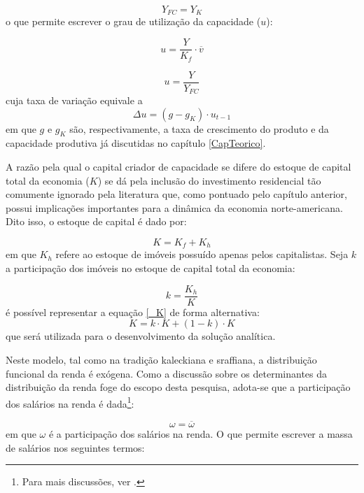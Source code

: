 \begin{equation}
\label{_YFC}
    Y_{FC} = Y_K
\end{equation}
o que permite escrever o grau de utilização da capacidade ($u$):

$$
u = \frac{Y}{K_f}\cdot \overline v
$$

\begin{equation}
\label{_u}
    u = \frac{Y}{Y_{FC}}
\end{equation}
cuja taxa de variação equivale a
\begin{equation}
\label{Aux}
\Delta u = (g - g_K)\cdot u_{t-1}
\end{equation}
em que $g$ e $g_K$ são, respectivamente, a taxa de crescimento do produto e da capacidade produtiva já discutidas no capítulo \ref{CapTeorico}.

A razão pela qual o capital criador de capacidade se difere do estoque de capital total da economia ($K$) se dá pela inclusão do investimento residencial tão comumente ignorado pela literatura que, como pontuado pelo capítulo anterior, possui implicações importantes para a dinâmica da economia norte-americana. Dito isso, o estoque de capital é dado por:

\begin{equation}
\label{_K}
    K = K_f + K_h
\end{equation}
em que $K_h$ refere ao estoque de imóveis possuído apenas pelos capitalistas. Seja $k$ a participação dos imóveis no estoque de capital total da economia:

\begin{equation}
\label{_tau}
k = \frac{K_h}{K}    
\end{equation}
é possível representar a equação \ref{_K} de forma alternativa:
$$
K = k\cdot K + (1-k)\cdot K
$$
que será utilizada para o desenvolvimento da solução analítica.

Neste modelo, tal como na tradição kaleckiana e sraffiana, a distribuição funcional da renda é exógena. Como a discussão sobre os determinantes da distribuição da renda foge do escopo desta pesquisa, adota-se que a participação dos salários na renda é dada\footnote{Para mais discussões, ver \textcite{pivetti_essay_1992}.}:

\begin{equation}
    \omega = \overline{\omega}
\end{equation}
em que $\omega$ é a participação dos salários na renda. O que permite escrever a massa de salários nos seguintes termos:

